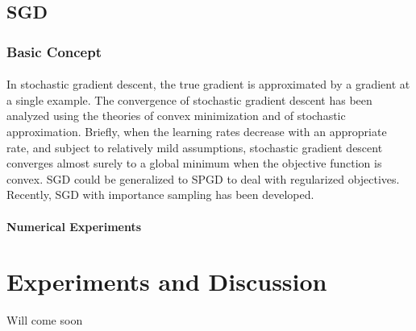 \documentclass[
10pt, %
a4paper, %
oneside, %
headinclude,footinclude, %
BCOR5mm, %
]{scrartcl}
\begin{document}

\subsection{SGD}

\subsubsection{Basic Concept}
\paragraph{}
In stochastic gradient descent, the true gradient is approximated by a 
gradient at a single example. The convergence of stochastic gradient descent 
has been analyzed using the theories of convex minimization and of stochastic 
approximation. Briefly, when the learning rates decrease with an appropriate 
rate, and subject to relatively mild assumptions, stochastic gradient descent 
converges almost surely to a global minimum when the objective function is 
convex. SGD could be generalized to SPGD \cite{nitanda2014stochastic} to deal 
with regularized objectives. Recently, SGD with importance sampling 
\cite{zhao2014stochastic} has been developed. 

\paragraph{Numerical Experiments} 



\section{Experiments and Discussion}
Will come soon 






%
%
\end{document}
